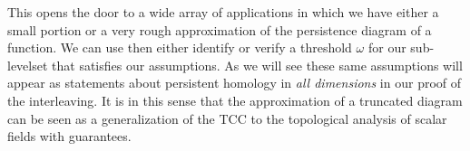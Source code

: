 %

This opens the door to a wide array of applications in which we have either a small portion or a very rough approximation of the persistence diagram of a function.
We can use then either identify or verify a threshold $\omega$ for our sub-levelset that satisfies our assumptions.
As we will see these same assumptions will appear as statements about persistent homology in \emph{all dimensions} in our proof of the interleaving.
It is in this sense that the approximation of a truncated diagram can be seen as a generalization of the TCC to the topological analysis of scalar fields with guarantees.

